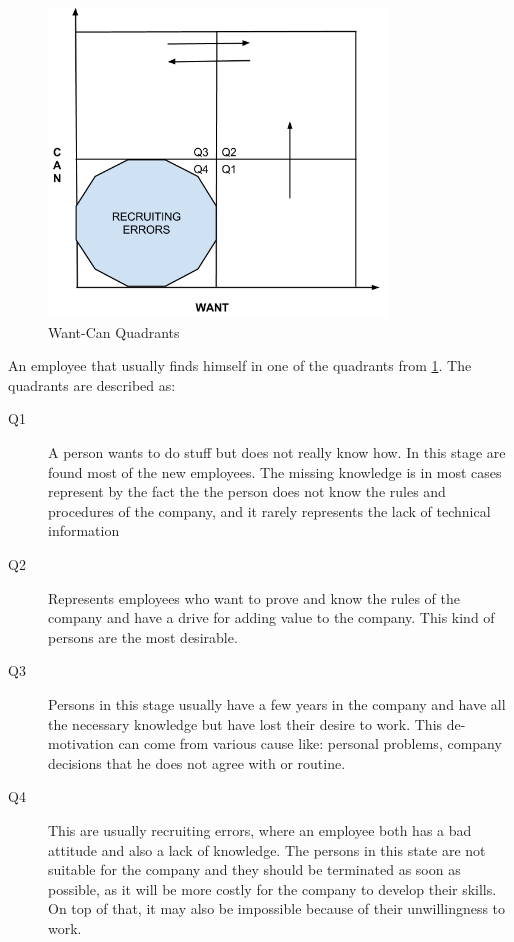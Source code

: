 \begin{figure}[h]
\centering
\includegraphics[width=0.8\textwidth]{img/wantcan.png}
\caption{Want-Can Quadrants}
\label{fig:quadrants}
\end{figure}

An employee that usually finds himself in one of the quadrants from \cref{fig:quadrants}. The quadrants are described as:

\begin{description}
\item[Q1] A person wants to do stuff but does not really know how. In this stage are found most of the new employees. The missing knowledge is in most cases represent by the fact the the person does not know the rules and procedures of the company, and it rarely represents the lack of technical information
\item[Q2] Represents employees who want to prove and know the rules of the company and have a drive for adding value to the company. This kind of persons are the most desirable.
\item[Q3] Persons in this stage usually have a few years in the company and have all the necessary knowledge but have lost their desire to work. This de-motivation can come from various cause like: personal problems, company decisions that he does not agree with or routine.
\item[Q4] This are usually recruiting errors, where an employee both has a bad attitude and also a lack of knowledge. The persons in this state are not suitable for the company and they should be terminated as soon as possible, as it will be more costly for the company to develop their skills. On top of that, it may also be impossible because of their unwillingness to work.
\end{description}

